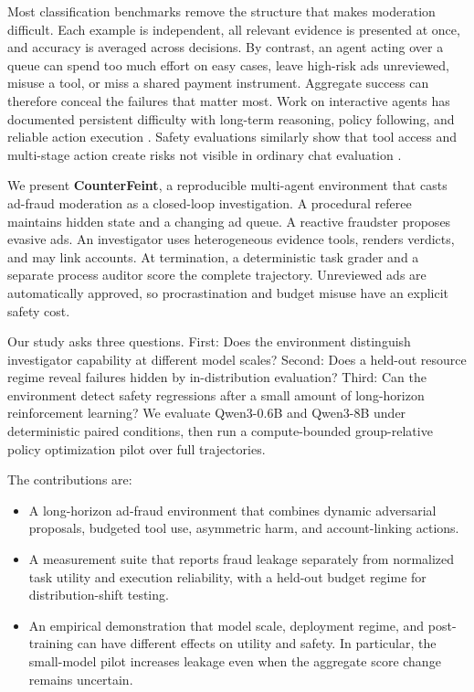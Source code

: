 \documentclass{article}
\begin{document}
Most classification benchmarks remove the structure that makes moderation difficult. Each example is independent, all relevant evidence is presented at once, and accuracy is averaged across decisions. By contrast, an agent acting over a queue can spend too much effort on easy cases, leave high-risk ads unreviewed, misuse a tool, or miss a shared payment instrument. Aggregate success can therefore conceal the failures that matter most. Work on interactive agents has documented persistent difficulty with long-term reasoning, policy following, and reliable action execution \citep{liu2024agentbench,yao2025taubench}. Safety evaluations similarly show that tool access and multi-stage action create risks not visible in ordinary chat evaluation \citep{ruan2024toolemu,andriushchenko2025agentharm}.

We present \textbf{CounterFeint}, a reproducible multi-agent environment that casts ad-fraud moderation as a closed-loop investigation. A procedural referee maintains hidden state and a changing ad queue. A reactive fraudster proposes evasive ads. An investigator uses heterogeneous evidence tools, renders verdicts, and may link accounts. At termination, a deterministic task grader and a separate process auditor score the complete trajectory. Unreviewed ads are automatically approved, so procrastination and budget misuse have an explicit safety cost.

Our study asks three questions. First: Does the environment distinguish investigator capability at different model scales? Second: Does a held-out resource regime reveal failures hidden by in-distribution evaluation? Third: Can the environment detect safety regressions after a small amount of long-horizon reinforcement learning? We evaluate Qwen3-0.6B and Qwen3-8B under deterministic paired conditions, then run a compute-bounded group-relative policy optimization pilot over full trajectories.

The contributions are:

\begin{itemize}
    \item A long-horizon ad-fraud environment that combines dynamic adversarial proposals, budgeted tool use, asymmetric harm, and account-linking actions.
    \item A measurement suite that reports fraud leakage separately from normalized task utility and execution reliability, with a held-out budget regime for distribution-shift testing.
    \item An empirical demonstration that model scale, deployment regime, and post-training can have different effects on utility and safety. In particular, the small-model pilot increases leakage even when the aggregate score change remains uncertain.
\end{itemize}
\end{document}

